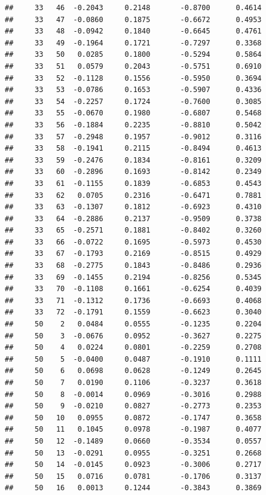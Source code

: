 \documentclass[
]{article}
\begin{document}
\begin{verbatim}
##     33   46  -0.2043     0.2148       -0.8700      0.4614  
##     33   47  -0.0860     0.1875       -0.6672      0.4953  
##     33   48  -0.0942     0.1840       -0.6645      0.4761  
##     33   49  -0.1964     0.1721       -0.7297      0.3368  
##     33   50   0.0285     0.1800       -0.5294      0.5864  
##     33   51   0.0579     0.2043       -0.5751      0.6910  
##     33   52  -0.1128     0.1556       -0.5950      0.3694  
##     33   53  -0.0786     0.1653       -0.5907      0.4336  
##     33   54  -0.2257     0.1724       -0.7600      0.3085  
##     33   55  -0.0670     0.1980       -0.6807      0.5468  
##     33   56  -0.1884     0.2235       -0.8810      0.5042  
##     33   57  -0.2948     0.1957       -0.9012      0.3116  
##     33   58  -0.1941     0.2115       -0.8494      0.4613  
##     33   59  -0.2476     0.1834       -0.8161      0.3209  
##     33   60  -0.2896     0.1693       -0.8142      0.2349  
##     33   61  -0.1155     0.1839       -0.6853      0.4543  
##     33   62   0.0705     0.2316       -0.6471      0.7881  
##     33   63  -0.1307     0.1812       -0.6923      0.4310  
##     33   64  -0.2886     0.2137       -0.9509      0.3738  
##     33   65  -0.2571     0.1881       -0.8402      0.3260  
##     33   66  -0.0722     0.1695       -0.5973      0.4530  
##     33   67  -0.1793     0.2169       -0.8515      0.4929  
##     33   68  -0.2775     0.1843       -0.8486      0.2936  
##     33   69  -0.1455     0.2194       -0.8256      0.5345  
##     33   70  -0.1108     0.1661       -0.6254      0.4039  
##     33   71  -0.1312     0.1736       -0.6693      0.4068  
##     33   72  -0.1791     0.1559       -0.6623      0.3040  
##     50    2   0.0484     0.0555       -0.1235      0.2204  
##     50    3  -0.0676     0.0952       -0.3627      0.2275  
##     50    4   0.0224     0.0801       -0.2259      0.2708  
##     50    5  -0.0400     0.0487       -0.1910      0.1111  
##     50    6   0.0698     0.0628       -0.1249      0.2645  
##     50    7   0.0190     0.1106       -0.3237      0.3618  
##     50    8  -0.0014     0.0969       -0.3016      0.2988  
##     50    9  -0.0210     0.0827       -0.2773      0.2353  
##     50   10   0.0955     0.0872       -0.1747      0.3658  
##     50   11   0.1045     0.0978       -0.1987      0.4077  
##     50   12  -0.1489     0.0660       -0.3534      0.0557  
##     50   13  -0.0291     0.0955       -0.3251      0.2668  
##     50   14  -0.0145     0.0923       -0.3006      0.2717  
##     50   15   0.0716     0.0781       -0.1706      0.3137  
##     50   16   0.0013     0.1244       -0.3843      0.3869  

\end{verbatim}
\end{document}
